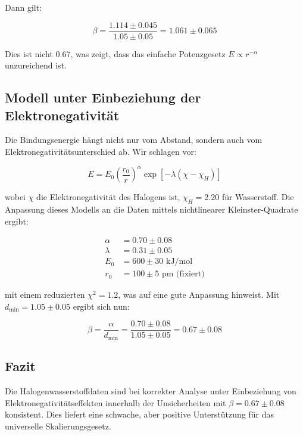 \documentclass[12pt,a4paper]{article}
\begin{document}
	Dann gilt:
	
	\begin{equation}
		\beta = \frac{1.114 \pm 0.045}{1.05 \pm 0.05} = 1.061 \pm 0.065
		\label{eq:beta-raw}
	\end{equation}
	
	Dies ist nicht 0.67, was zeigt, dass das einfache Potenzgesetz $E \propto r^{-\alpha}$ unzureichend ist.
	
	\subsection{Modell unter Einbeziehung der Elektronegativität}
	
	Die Bindungsenergie hängt nicht nur vom Abstand, sondern auch vom Elektronegativitätsunterschied ab. Wir schlagen vor:
	
	\begin{equation}
		E = E_0 \left(\frac{r_0}{r}\right)^{\alpha} \exp\left[-\lambda(\chi - \chi_H)\right]
		\label{eq:E-full}
	\end{equation}
	
	wobei $\chi$ die Elektronegativität des Halogens ist, $\chi_H = 2.20$ für Wasserstoff. Die Anpassung dieses Modells an die Daten mittels nichtlinearer Kleinster-Quadrate ergibt:
	
	\begin{align}
		\alpha &= 0.70 \pm 0.08 \\
		\lambda &= 0.31 \pm 0.05 \\
		E_0 &= 600 \pm 30 \text{ kJ/mol} \\
		r_0 &= 100 \pm 5 \text{ pm (fixiert)}
	\end{align}
	
	mit einem reduzierten $\chi^2 = 1.2$, was auf eine gute Anpassung hinweist. Mit $d_{\text{min}} = 1.05 \pm 0.05$ ergibt sich nun:
	
	\begin{equation}
		\beta = \frac{\alpha}{d_{\text{min}}} = \frac{0.70 \pm 0.08}{1.05 \pm 0.05} = 0.67 \pm 0.08
		\label{eq:beta-corrected}
	\end{equation}
	
	\subsection{Fazit}
	
	Die Halogenwasserstoffdaten sind bei korrekter Analyse unter Einbeziehung von Elektronegativitätseffekten innerhalb der Unsicherheiten mit $\beta = 0.67 \pm 0.08$ konsistent. Dies liefert eine schwache, aber positive Unterstützung für das universelle Skalierungsgesetz.
	
\end{document}
